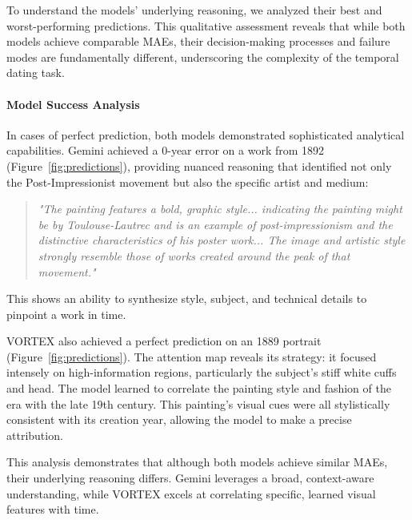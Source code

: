 \documentclass[10pt,twocolumn,letterpaper]{article}
\begin{document}
To understand the models' underlying reasoning, we analyzed their best and worst-performing predictions. This qualitative assessment reveals that while both models achieve comparable MAEs, their decision-making processes and failure modes are fundamentally different, underscoring the complexity of the temporal dating task.

\paragraph{Model Success Analysis}
In cases of perfect prediction, both models demonstrated sophisticated analytical capabilities. Gemini achieved a 0-year error on a work from 1892 (Figure~\ref{fig:predictions}), providing nuanced reasoning that identified not only the Post-Impressionist movement but also the specific artist and medium:
\begin{quote}
    \textit{"The painting features a bold, graphic style... indicating the painting might be by Toulouse-Lautrec and is an example of post-impressionism and the distinctive characteristics of his poster work... The image and artistic style strongly resemble those of works created around the peak of that movement."}
\end{quote}
This shows an ability to synthesize style, subject, and technical details to pinpoint a work in time.

VORTEX also achieved a perfect prediction on an 1889 portrait (Figure~\ref{fig:predictions}). The attention map reveals its strategy: it focused intensely on high-information regions, particularly the subject's stiff white cuffs and head. The model learned to correlate the painting style and fashion of the era with the late 19th century. This painting's visual cues were all stylistically consistent with its creation year, allowing the model to make a precise attribution.

This analysis demonstrates that although both models achieve similar MAEs, their underlying reasoning differs. Gemini leverages a broad, context-aware understanding, while VORTEX excels at correlating specific, learned visual features with time.
\end{document}
